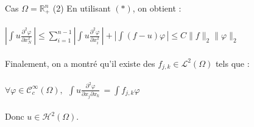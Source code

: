 \documentclass[10pt]{beamer}
\begin{document}
\begin{frame}{Cas $\Omega=\mathbb{R}^n_+$ (2)}
En utilisant $(*)$, on obtient : \\~\\

$\left |\displaystyle \int u \frac{\partial^2 \varphi}{\partial x_N^2} \, \right | \leq \displaystyle \sum_{i=1}^{n-1} \left |\displaystyle \int u \frac{\partial^2 \varphi}{\partial x_i^2} \, \right | + \left |\displaystyle \int (f-u) \varphi \, \right | \leq C \|f\|_2 \|\varphi\|_2$ \\~\\

Finalement, on a montré qu'il existe des $f_{j,k} \in \mathcal{L}^2(\Omega)$ tels que : \\~\\

$\forall \varphi  \in \mathcal{C}^\infty_c(\Omega), \ \ \displaystyle \int u \frac{\partial^2 \varphi}{\partial x_j  \partial x_k} \, = \displaystyle \int f_{j,k} \varphi \,$ \\~\\

Donc $u\in \mathcal{H}^2(\Omega)$.

\end{frame}
\end{document}
